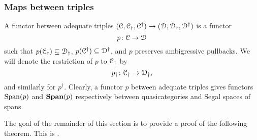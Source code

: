 \documentclass[main.tex]{subfiles}
\begin{document}
\subsubsection*{Maps between triples}

A functor between adequate triples $(\mathcal{C}, \mathcal{C}_{\dagger}, \mathcal{C}^{\dagger}) \to (\mathcal{D}, \mathcal{D}_{\dagger}, \mathcal{D}^{\dagger})$ is a functor
\begin{equation*}
  p\colon \mathcal{C} \to \mathcal{D}
\end{equation*}
such that $p(\mathcal{C}_{\dagger}) \subseteq \mathcal{D}_{\dagger}$, $p(\mathcal{C}^{\dagger}) \subseteq \mathcal{D}^{\dagger}$, and $p$ preserves ambigressive pullbacks. We will denote the restriction of $p$ to $\mathcal{C}_{\dagger}$ by
\begin{equation*}
  p_{\dagger}\colon\mathcal{C}_{\dagger} \to \mathcal{D}_{\dagger},
\end{equation*}
and similarly for $p^{\dagger}$. Clearly, a functor $p$ between adequate triples gives functors $\mathrm{Span}(p)$ and $\mathbf{Span}(p)$ respectively between quasicategories and Segal spaces of spans.

The goal of the remainder of this section is to provide a proof of the following theorem. This is \cite[Thm.\ 12.2]{spectralmackeyfunctors1}.
\end{document}

